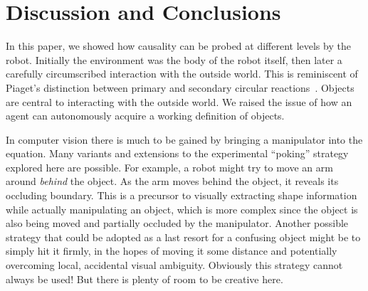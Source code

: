 
\section{Discussion and Conclusions}

In this paper, we showed how causality can be probed at different
levels by the robot.  Initially the environment was the body of the
robot itself, then later a carefully circumscribed interaction with
the outside world.  This is reminiscent of Piaget's distinction
between primary and secondary circular
reactions~\cite{ginsburg78piaget}.  Objects are central to interacting
with the outside world.  We raised the issue of how an agent can
autonomously acquire a working definition of objects. 

In computer vision there is much to be gained by bringing a
manipulator into the equation.  Many variants and extensions to the
experimental ``poking'' strategy explored here are possible.  For
example, a robot might try to move an arm around {\em behind} the
object.  As the arm moves behind the object, it reveals its occluding
boundary.  This is a precursor to visually extracting shape
information while actually manipulating an object, which is more
complex since the object is also being moved and partially occluded by
the manipulator.  Another possible strategy that could be adopted as a
last resort for a confusing object might be to simply hit it firmly,
in the hopes of moving it some distance and potentially overcoming
local, accidental visual ambiguity.  Obviously this strategy cannot
always be used!  But there is plenty of room to be creative here.

